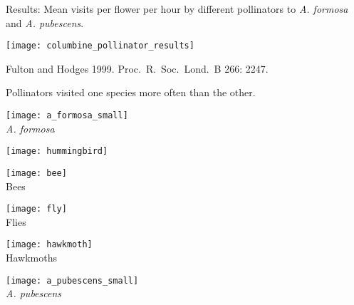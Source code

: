 \documentclass[t,hidelinks]{beamer}
\begin{document}
%
\begin{frame}[t]{Results: Mean visits per flower per hour by different pollinators to \textit{A. formosa} and \textit{A. pubescens}.}

	{\centering
	\texttt{[image: columbine\_pollinator\_results]}\par
	}

	\vfilll
	
	\tiny Fulton and Hodges 1999. Proc.~R.~Soc.~Lond.~B 266: 2247.
\end{frame}
%
\begin{frame}[t]{Pollinators visited one species more often than the other.}

	\vspace*{-1\baselineskip}
	
	\begin{multicols}{3}
		
		\vspace*{3\baselineskip}
		
		\texttt{[image: a\_formosa\_small]}\\
		\textit{A. formosa}
				
	\columnbreak
	
		\begin{center}
			
		\texttt{[image: hummingbird]}\\
		\vspace*{-0.5ex}{\footnotesize Hummingbirds}
		
		\bigskip

		\texttt{[image: bee]}\\
		{\footnotesize Bees}
		
		\bigskip
		
		\texttt{[image: fly]}\\
		{\footnotesize Flies}
		
		\bigskip
	
		\texttt{[image: hawkmoth]}\\
		{\footnotesize Hawkmoths}
		
		\end{center}
	\columnbreak
	
		\vspace*{3\baselineskip}

		\hfill \texttt{[image: a\_pubescens\_small]}\\
		\hfill \textit{A. pubescens}
		

\end{multicols}
\end{frame}
\end{document}
